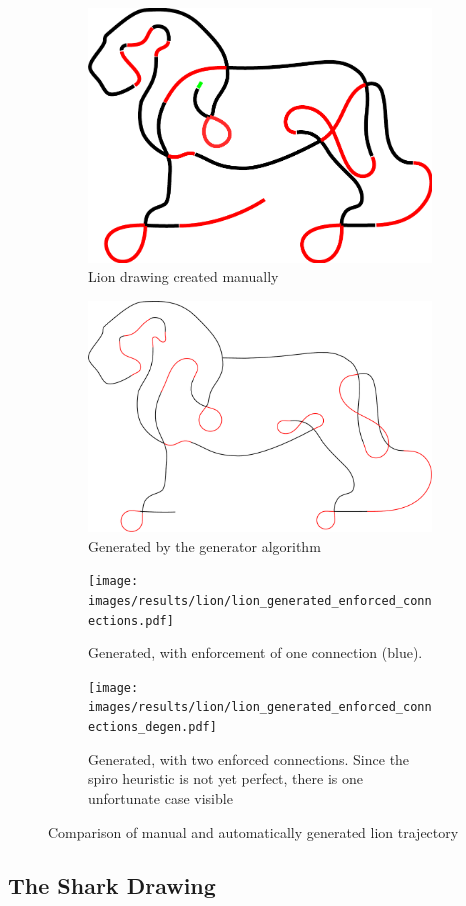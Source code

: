 \begin{figure}
\begin{subfigure}[b]{0.45\textwidth}
	\includegraphics[width=\textwidth]{images/results/lion/lion_handmade.pdf}
	\caption{Lion drawing created manually}
\end{subfigure}
\begin{subfigure}[b]{0.45\textwidth}
	\includegraphics[width=\textwidth]{images/results/lion/lion_generated_2.pdf}
	\caption{Generated by the generator algorithm}
\end{subfigure}
\begin{subfigure}[b]{0.45\textwidth}
	\texttt{[image: images/results/lion/lion\_generated\_enforced\_connections.pdf]}
	\caption{Generated, with enforcement of one connection (blue).}
\end{subfigure}
\begin{subfigure}[b]{0.45\textwidth}
	\texttt{[image: images/results/lion/lion\_generated\_enforced\_connections\_degen.pdf]}
	\caption{Generated, with two enforced connections. Since the spiro heuristic is not yet perfect, there is one unfortunate case visible}
\end{subfigure}

\caption{Comparison of manual and automatically generated lion trajectory}
\end{figure}

\subsection{The Shark Drawing}

